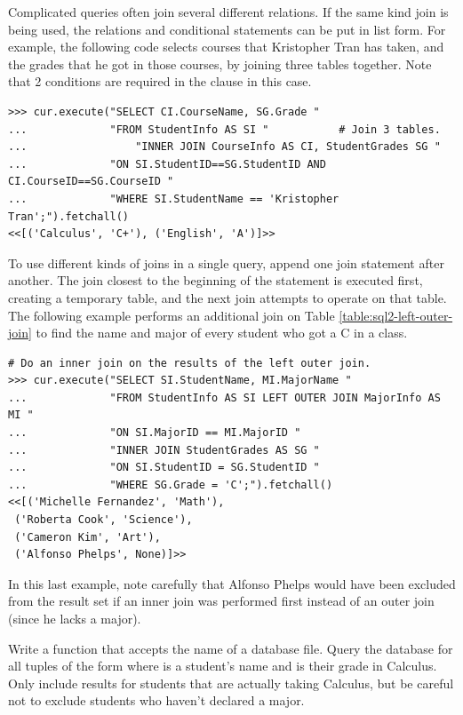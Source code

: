 Complicated queries often join several different relations.
If the same kind join is being used, the relations and conditional statements can be put in list form.
For example, the following code selects courses that Kristopher Tran has taken, and the grades that he got in those courses, by joining three tables together.
Note that 2 conditions are required in the  clause in this case.

\begin{lstlisting}
>>> cur.execute("SELECT CI.CourseName, SG.Grade "
...             "FROM StudentInfo AS SI "           # Join 3 tables.
...                 "INNER JOIN CourseInfo AS CI, StudentGrades SG "
...             "ON SI.StudentID==SG.StudentID AND CI.CourseID==SG.CourseID "
...             "WHERE SI.StudentName == 'Kristopher Tran';").fetchall()
<<[('Calculus', 'C+'), ('English', 'A')]>>
\end{lstlisting}

To use different kinds of joins in a single query, append one join statement after another.
The join closest to the beginning of the statement is executed first, creating a temporary table, and the next join attempts to operate on that table.
The following example performs an additional join on Table \ref{table:sql2-left-outer-join} to find the name and major of every student who got a C in a class.

\begin{lstlisting}
# Do an inner join on the results of the left outer join.
>>> cur.execute("SELECT SI.StudentName, MI.MajorName "
...             "FROM StudentInfo AS SI LEFT OUTER JOIN MajorInfo AS MI "
...             "ON SI.MajorID == MI.MajorID "
...             "INNER JOIN StudentGrades AS SG "
...             "ON SI.StudentID = SG.StudentID "
...             "WHERE SG.Grade = 'C';").fetchall()
<<[('Michelle Fernandez', 'Math'),
 ('Roberta Cook', 'Science'),
 ('Cameron Kim', 'Art'),
 ('Alfonso Phelps', None)]>>
\end{lstlisting}

In this last example, note carefully that Alfonso Phelps would have been excluded from the result set if an inner join was performed first instead of an outer join (since he lacks a major).

\begin{problem} %
Write a function that accepts the name of a database file.
Query the database for all tuples of the form  where  is a student's name and  is their grade in Calculus.
Only include results for students that are actually taking Calculus, but be careful not to exclude students who haven't declared a major.
\end{problem}

